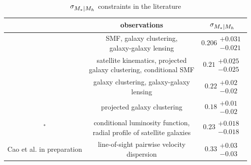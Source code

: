 \documentclass[12pt, letterpaper, preprint, tighten]{aastex62}
\newcommand{\siglogm}{\sigma_{\scaleto{M_*|M_h}{8pt}}}
\begin{document}
\begin{table}
    \caption{$\siglogm$ constraints in the literature} 
    \begin{center}
        \begin{tabular}{ccc} \toprule
            & observations & $\siglogm$  \\[3pt] \hline\hline
            \cite{leauthaud2012}    & \makecell{SMF, galaxy clustering,\\ galaxy-galaxy lensing}& $0.206\substack{+0.031\\-0.021}$\\\hline 
            \cite{reddick2013}      & \makecell{satellite kinematics, projected \\galaxy clustering, conditional SMF} & $0.21\substack{+0.025\\-0.025}$ \\\hline 
            \cite{zu2015}           & \makecell{galaxy clustering, galaxy-galaxy\\ lensing}& $0.22\substack{+0.02\\-0.02}$ \\\hline 
            \cite{tinker2017}       & projected galaxy clustering  & $0.18\substack{+0.01\\-0.02}$ \\\hline
            \cite{lange2018a}$^{*}$ & \makecell{conditional luminosity function,\\ radial profile of satellite galaxies} & $0.23\substack{+0.018\\-0.018}$ \\\hline
            Cao et al. in preparation & \makecell{line-of-sight pairwise velocity\\ dispersion} & $0.33\substack{+0.03\\-0.03}$ \\ [3pt]
    \hline
\end{tabular} \label{tab:lit}
\end{center}
\end{table}
\end{document}

